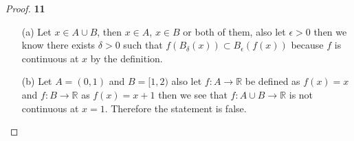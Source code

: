 \documentclass[11pt]{article}
\newcommand{\R}{\mathbb{R}}
\theoremstyle{definition}
\begin{document}
    \begin{proof}{\textbf{11}}
        \begin{itemize}
            \item [(a)] Let $x \in A \cup B$, then $x \in A$, $x \in B$ or both
            of them, also let $\epsilon > 0$ then we know there exists
            $\delta > 0$ such that $f(B_\delta(x)) \subset B_\epsilon(f(x))$
            because $f$ is continuous at $x$ by the definition.
            \item [(b)] Let $A = (0,1)$ and $B = [1,2)$ also let $f:A \to \R$ be
            defined as $f(x) = x$ and $f: B\to\R$ as $f(x) = x + 1$ then we
            see that $f:A \cup B \to \R$ is not continuous at $x=1$. Therefore
            the statement is false.            
        \end{itemize}
    \end{proof}
\end{document}
